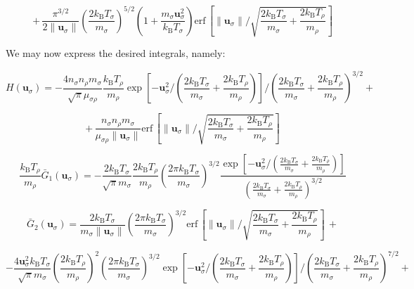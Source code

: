 \begin{equation}
    +\,\frac{\pi^{3/2}}{2\|\mathbf{u}_\sigma\|}\left(\frac{2k_\mathrm{B}T_\sigma}{m_\sigma}\right)^{5/2}\left(1+\frac{m_\sigma\mathbf{u}_\sigma^2}{k_\mathrm{B}T_\sigma}\right)\text{erf}\,{\left[\|\mathbf{u}_\sigma\|\bigg/\sqrt{\frac{2k_\mathrm{B}T_\sigma}{m_\sigma}+\frac{2k_\mathrm{B}T_\rho}{m_\rho}}\right]}
\end{equation}

We may now express the desired integrals, namely:

\begin{equation*}
    H(\mathbf{u}_\sigma)=-\frac{4n_\sigma n_\rho m_\sigma}{\sqrt{\pi}\mu_{\sigma\rho}}\frac{k_\mathrm{B}T_\rho}{m_\rho}\exp{\left[-\mathbf{u}_\sigma^2\bigg/\left(\frac{2k_\mathrm{B}T_\sigma}{m_\sigma}+\frac{2k_\mathrm{B}T_\rho}{m_\rho}\right)\right]}\bigg/\left(\frac{2k_\mathrm{B}T_\sigma}{m_\sigma}+\frac{2k_\mathrm{B}T_\rho}{m_\rho}\right)^{3/2}+
\end{equation*}

\begin{equation}
    +\,\frac{n_\sigma n_\rho m_\sigma}{\mu_{\sigma\rho}\|\mathbf{u}_\sigma\|}\text{erf}\,\left[\|\mathbf{u}_\sigma\|\bigg/\sqrt{\frac{2k_\mathrm{B}T_\sigma}{m_\sigma}+\frac{2k_\mathrm{B}T_\rho}{m_\rho}}\right]
\end{equation}

\begin{equation}
    \frac{k_\mathrm{B}T_\rho}{m_\rho}\bar{G}_1(\mathbf{u}_\sigma)=-\frac{2k_\mathrm{B}T_\sigma}{\sqrt{\pi}m_\sigma}\frac{2k_\mathrm{B}T_\rho}{m_\rho}\left(\frac{2\pi k_\mathrm{B}T_\sigma}{m_\sigma}\right)^{3/2}\frac{\exp{\left[-\mathbf{u}_\sigma^2\bigg/\left(\frac{2k_\mathrm{B}T_\sigma}{m_\sigma}+\frac{2k_\mathrm{B}T_\rho}{m_\rho}\right)\right]}}{\left(\frac{2k_\mathrm{B}T_\sigma}{m_\sigma}+\frac{2k_\mathrm{B}T_\rho}{m_\rho}\right)^{3/2}}
\end{equation}

\begin{equation*}
    \bar{G}_2(\mathbf{u}_\sigma)=\frac{2k_\mathrm{B}T_\sigma}{m_\sigma\|\mathbf{u}_\sigma\|}\left(\frac{2\pi k_\mathrm{B}T_\sigma}{m_\sigma}\right)^{3/2}\text{erf}\,\left[\|\mathbf{u}_\sigma\|\bigg/\sqrt{\frac{2k_\mathrm{B}T_\sigma}{m_\sigma}+\frac{2k_\mathrm{B}T_\rho}{m_\rho}}\right]\,+
\end{equation*}

\begin{equation*}
    -\frac{4\mathbf{u}_\sigma^2k_\mathrm{B}T_\sigma}{\sqrt{\pi}m_\sigma}\left(\frac{2k_\mathrm{B}T_\rho}{m_\rho}\right)^2\left(\frac{2\pi k_\mathrm{B}T_\sigma}{m_\sigma}\right)^{3/2}\exp{\left[-\mathbf{u}_\sigma^2\bigg/\left(\frac{2k_\mathrm{B}T_\sigma}{m_\sigma}+\frac{2k_\mathrm{B}T_\rho}{m_\rho}\right)\right]}\bigg/\left(\frac{2k_\mathrm{B}T_\sigma}{m_\sigma}+\frac{2k_\mathrm{B}T_\rho}{m_\rho}\right)^{7/2}+
\end{equation*}

